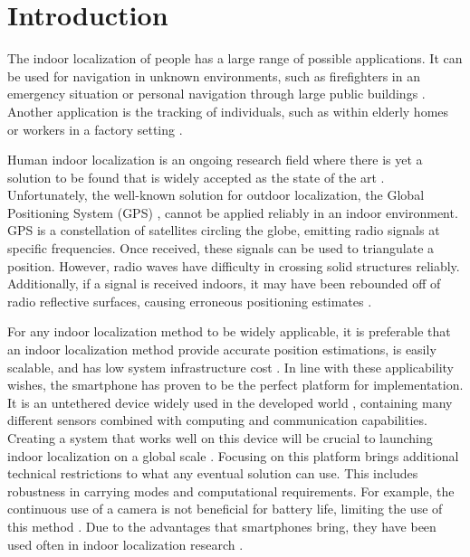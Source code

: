 
\chapter{Introduction} \label{chap:intro}

The indoor localization of people has a large range of possible applications. It can be used for navigation in unknown environments, such as firefighters in an emergency situation or personal navigation through large public buildings \cite{Correa2017, Jackermeier2018}. Another application is the tracking of individuals, such as within elderly homes or workers in a factory setting \cite{Correa2017}. \par

Human indoor localization is an ongoing research field where there is yet a solution to be found that is widely accepted as the state of the art \cite{Davidson2017}. Unfortunately, the well-known solution for outdoor localization, the Global Positioning System (GPS) \cite{Jackermeier2018}, cannot be applied reliably in an indoor environment. GPS is a constellation of satellites circling the globe, emitting radio signals at specific frequencies. Once received, these signals can be used to triangulate a position. However, radio waves have difficulty in crossing solid structures reliably. Additionally, if a signal is received indoors, it may have been rebounded off of radio reflective surfaces, causing erroneous positioning estimates \cite{Jackermeier2018}. \par 

For any indoor localization method to be widely applicable, it is preferable that an indoor localization method provide accurate position estimations, is easily scalable, and has low system infrastructure cost \cite{Correa2017}.
In line with these applicability wishes, the smartphone has proven to be the perfect platform for implementation. It is an untethered device widely used in the developed world \cite{Correa2017}, containing many different sensors combined with computing and communication capabilities.
Creating a system that works well on this device will be crucial to launching indoor localization on a global scale \cite{Gu2019}. Focusing on this platform brings additional technical restrictions to what any eventual solution can use. This includes robustness in carrying modes and computational requirements.  For example, the continuous use of a camera is not beneficial for battery life, limiting the use of this method \cite{Yang2014, Solin2018a}. Due to the advantages that smartphones bring, they have been used often in indoor localization research \cite{Jackermeier2018,Correa2017,Yang2014, Qian2013}. \par 

